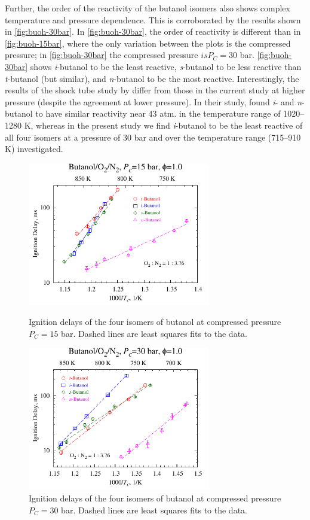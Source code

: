 \documentclass[12pt, letterpaper]{article}
\begin{document}
Further, the order of the reactivity of the butanol isomers also shows complex
temperature and pressure dependence. This is corroborated by the results shown
in \autoref{fig:buoh-30bar}. In \autoref{fig:buoh-30bar}, the order of
reactivity is different than in \autoref{fig:buoh-15bar}, where the only
variation between the plots is the compressed pressure; in
\autoref{fig:buoh-30bar} the compressed pressure $is P_C=30$ bar.
\autoref{fig:buoh-30bar} shows \textit{i}-butanol to be the least reactive,
\textit{s}-butanol to be less reactive than \textit{t}-butanol (but similar),
and \textit{n}-butanol to be the most reactive. Interestingly, the results of
the shock tube study by \textcite{Stranic2012} differ from those in the current
study at higher pressure (despite the agreement at lower pressure). In their
study, \textcite{Stranic2012} found \textit{i}- and \textit{n}-butanol to have
similar reactivity near 43 atm. in the temperature range of 1020–1280 K,
whereas in the present study we find \textit{i}-butanol to be the least
reactive of all four isomers at a pressure of 30 bar and over the temperature
range (715–910 K) investigated.

\begin{figure}
    \centering
    \begin{minipage}{0.45\textwidth}
        \includegraphics[width=8cm]{03-Butanol/buoh-15bar}
        \caption{Ignition delays of the four isomers of butanol at compressed
            pressure $P_C=15$ bar. Dashed lines are least squares fits to the
            data.}
        \label{fig:buoh-15bar}
    \end{minipage}
    \quad
    \begin{minipage}{0.45\textwidth}
        \includegraphics[width=8cm]{03-Butanol/buoh-30bar}
        \caption{Ignition delays of the four isomers of butanol at compressed
            pressure $P_C=30$ bar. Dashed lines are least squares fits to the
            data.}
        \label{fig:buoh-30bar}
    \end{minipage}
\end{figure}
\end{document}
